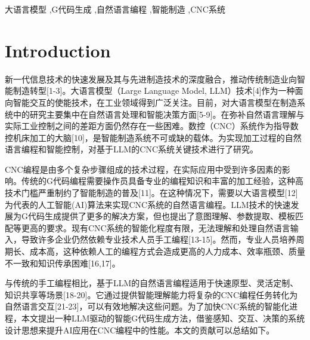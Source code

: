 \documentclass[preprint,12pt]{elsarticle}
\begin{document}
\begin{frontmatter}


\begin{keyword}
大语言模型 \sep G代码生成 \sep 自然语言编程 \sep 智能制造 \sep CNC系统

\end{keyword}

\end{frontmatter}


\section{Introduction}

新一代信息技术的快速发展及其与先进制造技术的深度融合，推动传统制造业向智能制造转型[1-3]。大语言模型（Large Language Model, LLM）技术[4]作为一种面向智能交互的使能技术，在工业领域得到广泛关注。目前，对大语言模型在制造系统中的研究主要集中在自然语言处理和智能决策方面[5-9]。在弥补自然语言理解与实际工业控制之间的差距方面仍然存在一些困难。数控（CNC）系统作为指导数控机床加工的大脑[10]，是智能制造系统不可或缺的载体。为实现加工过程的自然语言编程和智能控制，对基于LLM的CNC系统关键技术进行了研究。

CNC编程是由多个复杂步骤组成的技术过程，在实际应用中受到许多因素的影响。传统的G代码编程需要操作员具备专业的编程知识和丰富的加工经验，这种高技术门槛严重制约了智能制造的普及[11]。在这种情况下，需要以大语言模型[12]为代表的人工智能(AI)算法来实现CNC系统的自然语言编程。LLM技术的快速发展为G代码生成提供了更多的解决方案，但也提出了意图理解、参数提取、模板匹配等更高的要求。现有CNC系统的智能化程度有限，无法理解和处理自然语言输入，导致许多企业仍然依赖专业技术人员手工编程[13-15]。然而，专业人员培养周期长、成本高，这种依赖人工的编程方式会造成更高的人力成本、效率瓶颈、质量不一致和知识传承困难[16,17]。

与传统的手工编程相比，基于LLM的自然语言编程适用于快速原型、灵活定制、知识共享等场景[18-20]。它通过提供智能理解能力将复杂的CNC编程任务转化为自然语言交互[21-23]，可以有效地解决这些问题。为了加快CNC系统的智能化进程，本文提出一种LLM驱动的智能G代码生成方法，借鉴感知、交互、决策的系统设计思想来提升AI应用在CNC编程中的性能。本文的贡献可以总结如下。
\end{document}
